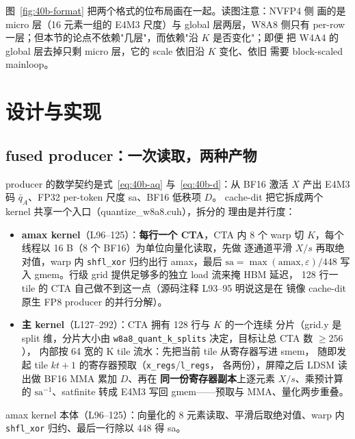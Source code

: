 图~\ref{fig:40b-format} 把两个格式的位布局画在一起。读图注意：NVFP4 侧
画的是 micro 层（16 元素一组的 E4M3 尺度）与 global 层两层，W8A8 侧只有
per-row 一层；但本节的论点不依赖"几层"，而依赖"沿 $K$ 是否变化"；即便
把 W4A4 的 global 层去掉只剩 micro 层，它的 scale 依旧沿 $K$ 变化、依旧
需要 block-scaled mainloop。

\section{设计与实现}\label{sec:40b-design}

\subsection{fused producer：一次读取，两种产物}\label{sec:40b-producer}

producer 的数学契约是式~\eqref{eq:40b-aq} 与~\eqref{eq:40b-d}：从 BF16
激活 $X$ 产出 E4M3 码 $\bar q_A$、FP32 per-token 尺度 sa、BF16 低秩项 $D$。
cache-dit 把它拆成两个 kernel 共享一个入口（quantize\_w8a8.cuh），拆分的
理由是并行度：

\begin{itemize}[itemsep=1pt,topsep=2pt]
  \item \textbf{amax kernel}（L96--125）：\textbf{每行一个 CTA}，CTA 内 8 个
        warp 切 $K$，每个线程以 16 B（8 个 BF16）为单位向量化读取，先做
        逐通道平滑 $X/s$ 再取绝对值，warp 内 \texttt{shfl\_xor} 归约出行
        amax，最后 $\mathrm{sa}=\max(\mathrm{amax},\varepsilon)/448$ 写入
        gmem。行级 grid 提供足够多的独立 load 流来掩 HBM 延迟，
        128 行一 tile 的 CTA 自己做不到这一点（源码注释 L93--95 明说这是在
        镜像 cache-dit 原生 FP8 producer 的并行分解）。
  \item \textbf{主 kernel}（L127--292）：CTA 拥有 128 行与 $K$ 的一个连续
        分片（grid.y 是 split 维，分片大小由
        \texttt{w8a8\_\allowbreak{}quant\_\allowbreak{}k\_\allowbreak{}splits}
        决定，目标让总 CTA 数 $\ge256$），
        内部按 64 宽的 K tile 流水：先把当前 tile 从寄存器写进 smem，
        随即发起 tile $kt{+}1$ 的寄存器预取（\texttt{x\_regs}/\texttt{l\_regs}，
        各两份），屏障之后 LDSM 读出做 BF16 MMA 累加 $D$、再在
        \textbf{同一份寄存器副本}上逐元素 $X/s$、乘预计算的
        $\mathrm{sa}^{-1}$、satfinite 转成 E4M3 写回 gmem——预取与
        MMA、量化两步重叠。
\end{itemize}

amax kernel 本体（L96--125）：向量化的 8 元素读取、平滑后取绝对值、warp
内 \texttt{shfl\_xor} 归约、最后一行除以 448 得 sa。

